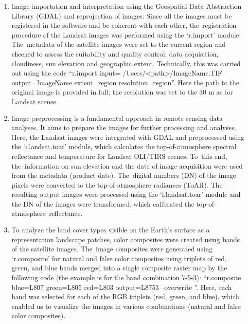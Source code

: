 \documentclass[coasts,article,accept,pdftex,oneauthor]{Definitions/mdpi}
\begin{document}
\begin{enumerate}
  \item Image importation and interpretation {using the Geospatial Data Abstraction Library (GDAL){ }and reprojection of images{: }Since all the images must be registered in the software {and be coherent with each other},  %
  the~registration procedure of the Landsat images was performed using the} `r.import' module. The~metadata of the satellite images {were  set to the current region and checked} %
to assess the suitability and quality control: data acquisition, cloudiness{, }sun elevation {and {geographic} extent. Technically, this was carried out using {the }code ``r.import input{=}%
/Users/<path>/ImageName.TIF output=ImageName extent=region resolution=region''. Here the path to the original image is provided in full; the resolution was set to the 30 m as for Landsat scenes}.
  \item Image preprocessing is a fundamental approach in remote sensing data analyses{. It  aims} to prepare the images for further processing and analyses. Here, the Landsat images were integrated with GDAL and preprocessed using the `i.landsat.toar'{ }module, which calculates the top-of-atmosphere spectral reflectance and temperature for Landsat OLI/TIRS scenes. To~this end, the~information on sun elevation and the date of image acquisition {were} used from the metadata (product date). The~digital numbers (DN) of the image pixels were converted to the top-of-atmosphere radiances (ToAR). {The resulting output images {were }processed using the `i.landsat.toar' module {and}  {the }DN of {the} images were transformed, which{ }calibrated {the} top-of-atmosphere~reflectance.}
  \item {To analyze the land cover types visible on the Earth's surface as a representation landscape patches, color} composites {were created using bands of the satellite images}. The~image composites were generated using `r.composite' for natural and false color composites using triplets of red, green, and blue bands merged into a single composite raster map {by the following code (the example is for the band combination {7-5-3}): ``r.composite blue=L807 green=L805 red=L803 output=L8753 {--overwrite}%
''. Here, each band was selected for each of the RGB triplets (red, green, and blue), which enabled us to visualize the images in various combinations (natural and false color composites)}. 

\end{enumerate}
\end{document}

